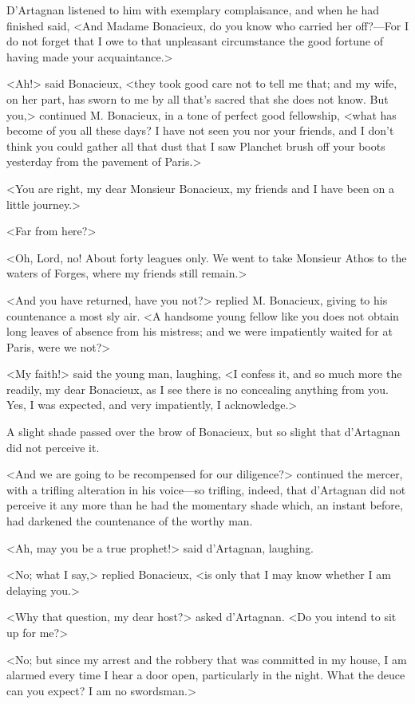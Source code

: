D'Artagnan listened to him with exemplary complaisance, and when he had finished said, <And Madame Bonacieux, do you know who carried her off?---For I do not forget that I owe to that unpleasant circumstance the good fortune of having made your acquaintance.> 

<Ah!> said Bonacieux, <they took good care not to tell me that; and my wife, on her part, has sworn to me by all that's sacred that she does not know. But you,> continued M. Bonacieux, in a tone of perfect good fellowship, <what has become of you all these days? I have not seen you nor your friends, and I don't think you could gather all that dust that I saw Planchet brush off your boots yesterday from the pavement of Paris.> 

<You are right, my dear Monsieur Bonacieux, my friends and I have been on a little journey.> 

<Far from here?> 

<Oh, Lord, no! About forty leagues only. We went to take Monsieur Athos to the waters of Forges, where my friends still remain.> 

<And you have returned, have you not?> replied M. Bonacieux, giving to his countenance a most sly air. <A handsome young fellow like you does not obtain long leaves of absence from his mistress; and we were impatiently waited for at Paris, were we not?> 

<My faith!> said the young man, laughing, <I confess it, and so much more the readily, my dear Bonacieux, as I see there is no concealing anything from you. Yes, I was expected, and very impatiently, I acknowledge.> 

A slight shade passed over the brow of Bonacieux, but so slight that d'Artagnan did not perceive it. 

<And we are going to be recompensed for our diligence?> continued the mercer, with a trifling alteration in his voice---so trifling, indeed, that d'Artagnan did not perceive it any more than he had the momentary shade which, an instant before, had darkened the countenance of the worthy man. 

<Ah, may you be a true prophet!> said d'Artagnan, laughing. 

<No; what I say,> replied Bonacieux, <is only that I may know whether I am delaying you.> 

<Why that question, my dear host?> asked d'Artagnan. <Do you intend to sit up for me?> 

<No; but since my arrest and the robbery that was committed in my house, I am alarmed every time I hear a door open, particularly in the night. What the deuce can you expect? I am no swordsman.> 

